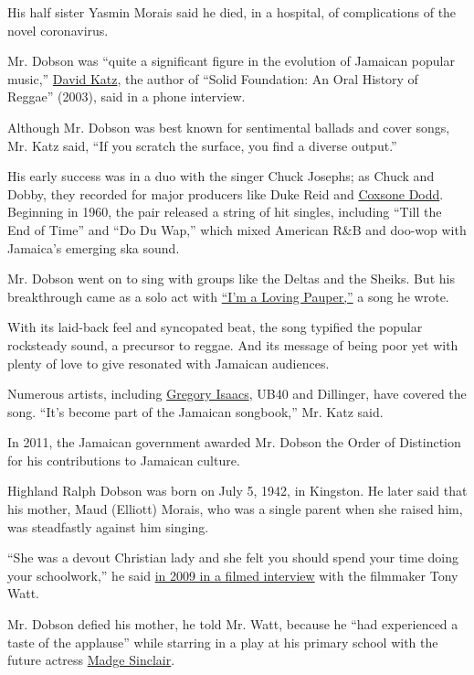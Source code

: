 His half sister Yasmin Morais said he died, in a hospital, of
complications of the novel coronavirus.

Mr. Dobson was ``quite a significant figure in the evolution of Jamaican
popular music,''
\href{https://sites.google.com/site/authordavidkatz/}{David Katz}, the
author of ``Solid Foundation: An Oral History of Reggae'' (2003), said
in a phone interview.

Although Mr. Dobson was best known for sentimental ballads and cover
songs, Mr. Katz said, ``If you scratch the surface, you find a diverse
output.''

His early success was in a duo with the singer Chuck Josephs; as Chuck
and Dobby, they recorded for major producers like Duke Reid and
\href{https://www.nytimes3xbfgragh.onion/2004/05/06/arts/coxsone-dodd-72-pioneer-of-the-jamaican-pop-music-scene.html}{Coxsone
Dodd}. Beginning in 1960, the pair released a string of hit singles,
including ``Till the End of Time'' and ``Do Du Wap,'' which mixed
American R\&B and doo-wop with Jamaica's emerging ska sound.

Mr. Dobson went on to sing with groups like the Deltas and the Sheiks.
But his breakthrough came as a solo act with
\href{https://www.youtube.com/watch?v=0ZcGDurZrak}{``I'm a Loving
Pauper,''} a song he wrote.

With its laid-back feel and syncopated beat, the song typified the
popular rocksteady sound, a precursor to reggae. And its message of
being poor yet with plenty of love to give resonated with Jamaican
audiences.

Numerous artists, including
\href{https://www.youtube.com/watch?v=wM_m1EJRGjI}{Gregory Isaacs}, UB40
and Dillinger, have covered the song. ``It's become part of the Jamaican
songbook,'' Mr. Katz said.

In 2011, the Jamaican government awarded Mr. Dobson the Order of
Distinction for his contributions to Jamaican culture.

Highland Ralph Dobson was born on July 5, 1942, in Kingston. He later
said that his mother, Maud (Elliott) Morais, who was a single parent
when she raised him, was steadfastly against him singing.

``She was a devout Christian lady and she felt you should spend your
time doing your schoolwork,'' he said
\href{https://www.imdb.com/title/tt1894441/}{in 2009 in a filmed
interview} with the filmmaker Tony Watt.

Mr. Dobson defied his mother, he told Mr. Watt, because he ``had
experienced a taste of the applause'' while starring in a play at his
primary school with the future actress
\href{https://www.nytimes3xbfgragh.onion/1995/12/23/arts/madge-sinclair-57-tv-and-film-actress.html}{Madge
Sinclair}.

